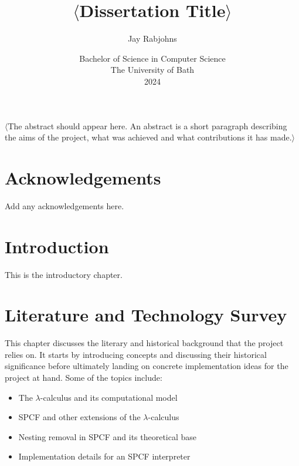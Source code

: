 \documentclass[12pt,a4paper]{report}
\title{\bf $\langle$Dissertation Title$\rangle$}
\author{Jay Rabjohns}
\date{Bachelor of Science in Computer Science\\ 
      The University of Bath\\
      2024}
\theoremstyle{definition}
\theoremstyle{remark}
\begin{document}
\hypersetup{pageanchor=false}

\lstset{language=Haskell,breaklines,breakatwhitespace,basicstyle=\small}

\setcounter{page}{0}

\maketitle
\newpage

\newpage

\hypersetup{pageanchor=true}
\abstract
$\langle$The abstract should appear here. An abstract is a short paragraph describing the aims of the project, what was achieved and what contributions it has made.$\rangle$
\newpage

\tableofcontents
\newpage



\chapter*{Acknowledgements}
Add any acknowledgements here.

\newpage
\setcounter{page}{1}
\chapter{Introduction}
This is the introductory chapter.

\chapter{Literature and Technology Survey}
This chapter discusses the literary and historical background that the project relies on. It starts by introducing concepts and discussing their historical significance before ultimately landing on concrete implementation ideas for the project at hand. Some of the topics include:
\begin{itemize}
    \item The $\lambda$-calculus and its computational model
    \item SPCF and other extensions of the $\lambda$-calculus
    \item Nesting removal in SPCF and its theoretical base
    \item Implementation details for an SPCF interpreter
\end{itemize}
\end{document}
